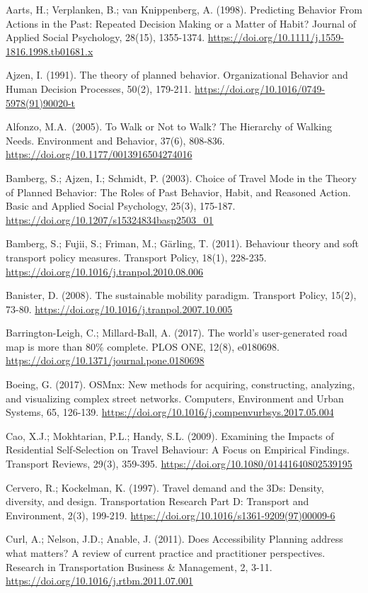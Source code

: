 \documentclass[
  11pt,
  a4paper,
]{article}
\begin{document}
Aarts, H.; Verplanken, B.; van Knippenberg, A. (1998). Predicting
Behavior From Actions in the Past: Repeated Decision Making or a Matter
of Habit? Journal of Applied Social Psychology, 28(15), 1355-1374.
\url{https://doi.org/10.1111/j.1559-1816.1998.tb01681.x}

Ajzen, I. (1991). The theory of planned behavior. Organizational
Behavior and Human Decision Processes, 50(2), 179-211.
\url{https://doi.org/10.1016/0749-5978(91)90020-t}

Alfonzo, M.A.~(2005). To Walk or Not to Walk? The Hierarchy of Walking
Needs. Environment and Behavior, 37(6), 808-836.
\url{https://doi.org/10.1177/0013916504274016}

Bamberg, S.; Ajzen, I.; Schmidt, P. (2003). Choice of Travel Mode in the
Theory of Planned Behavior: The Roles of Past Behavior, Habit, and
Reasoned Action. Basic and Applied Social Psychology, 25(3), 175-187.
\url{https://doi.org/10.1207/s15324834basp2503_01}

Bamberg, S.; Fujii, S.; Friman, M.; Gärling, T. (2011). Behaviour theory
and soft transport policy measures. Transport Policy, 18(1), 228-235.
\url{https://doi.org/10.1016/j.tranpol.2010.08.006}

Banister, D. (2008). The sustainable mobility paradigm. Transport
Policy, 15(2), 73-80.
\url{https://doi.org/10.1016/j.tranpol.2007.10.005}

Barrington-Leigh, C.; Millard-Ball, A. (2017). The world's
user-generated road map is more than 80\% complete. PLOS ONE, 12(8),
e0180698. \url{https://doi.org/10.1371/journal.pone.0180698}

Boeing, G. (2017). OSMnx: New methods for acquiring, constructing,
analyzing, and visualizing complex street networks. Computers,
Environment and Urban Systems, 65, 126-139.
\url{https://doi.org/10.1016/j.compenvurbsys.2017.05.004}

Cao, X.J.; Mokhtarian, P.L.; Handy, S.L. (2009). Examining the Impacts
of Residential Self‐Selection on Travel Behaviour: A Focus on Empirical
Findings. Transport Reviews, 29(3), 359-395.
\url{https://doi.org/10.1080/01441640802539195}

Cervero, R.; Kockelman, K. (1997). Travel demand and the 3Ds: Density,
diversity, and design. Transportation Research Part D: Transport and
Environment, 2(3), 199-219.
\url{https://doi.org/10.1016/s1361-9209(97)00009-6}

Curl, A.; Nelson, J.D.; Anable, J. (2011). Does Accessibility Planning
address what matters? A review of current practice and practitioner
perspectives. Research in Transportation Business \& Management, 2,
3-11. \url{https://doi.org/10.1016/j.rtbm.2011.07.001}
\end{document}

